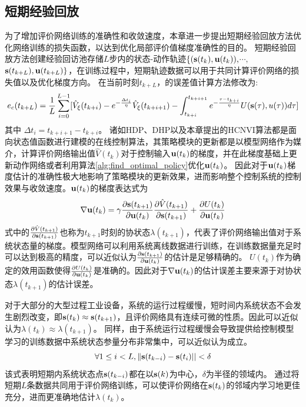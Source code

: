 \subsection{短期经验回放}
为了增加评价网络训练的准确性和收敛速度，本章进一步提出短期经验回放方法优化网络训练的损失函数，以达到优化局部评价值梯度准确性的目的。
短期经验回放方法创建经验回访池存储$L$步内的状态-动作轨迹$\{(\mathbf s(t_k), \mathbf u(t_k))\text{,}$$\cdots \text{,}$$\mathbf s(t_{k+L}), \mathbf u(t_{k+L})\}$，在训练过程中，短期轨迹数据可以用于共同计算评价网络的损失值以及优化梯度方向。
在当前时刻$t_{k+L}$，的误差值计算方法修改为:
\begin{equation}
  e_{c }(t_{k+L})=\frac{1}{L}\sum_{i=0}^{L-1}[\hat{V}_{\xi}(t_{k+i})-e^{-\frac{\Delta t_i}{\eta}} \hat{V}_{\xi}(t_{k+i+1})-\int_{t_{k+i}}^{t_{k+i+1}}e^{-\frac{\tau-t_{k+i}}{\eta}}U(\mathbf s(\tau), u(\tau))d \tau]
  \label{equ:TDerror_replay}
  \end{equation}
  其中 $\Delta t_i = t_{k+i+1}-t_{k+i}$。
诸如HDP、DHP以及本章提出的HCNVI算法都是面向状态值函数进行建模的在线控制算法，其策略模块的更新都是以模型网络作为媒介，计算评价网络输出值$\hat{V}(t_k)$对于控制输入${\mathbf
u}(t_k)$的梯度，并在此梯度基础上更新动作网络或者利用算法\ref{alg:find_optimal_policy}优化${\mathbf u}(t_k)$。
因此对于${\mathbf u}(t_k)$梯度估计的准确性极大地影响了策略模块的更新效果，进而影响整个控制系统的控制效果与收敛速度。${\mathbf u}(t_k)$的梯度表达式为
\begin{equation}
\label{equ:uk_grad} \nabla \mathbf u(t_k)=\gamma\frac{\partial \mathbf s(t_{k+1})}{\partial \mathbf u(t_k)}\frac{\partial\hat{V}(t_{k+1})}{\partial \mathbf s(t_{k+1})}+\frac{\partial U(t_k)}{\partial \mathbf u(t_k)}
\end{equation}
式中的$\frac{\partial\hat{V}(t_{k+1})}{\partial \mathbf
s(t_{k+1})}$也称为$t_{k+1}$时刻的协状态$\lambda(t_{k+1})$，代表了评价网络输出值对于系统状态量的梯度。模型网络可以利用系统离线数据进行训练，在训练数据量充足时可以达到极高的精度，可以近似认为$\frac{\partial
\mathbf s(t_{k+1})}{\partial \mathbf u(t_k)}$的估计是足够精确的。
$U(t_k)$作为确定的效用函数使得$\frac{\partial U(t_k)}{\partial \mathbf
u(t_k)}$是准确的。因此对于$\nabla \mathbf
u(t_k)$的估计误差主要来源于对协状态$\lambda(t_{k+1})$的估计误差。

对于大部分的大型过程工业设备，系统的运行过程缓慢，短时间内系统状态不会发生剧烈改变，即$\mathbf s(t_k)\approx \mathbf s(t_{k+1})$，且评价网络具有连续可微的性质。因此可以近似认为$\lambda(t_k)\approx \lambda(t_{k+1})$。
同样，由于系统运行过程缓慢会导致提供给控制模型学习的训练数据中系统状态参量分布非常集中，可以近似认为成立。
\begin{equation}
\label{equ:x_equation} \forall 1 \leq i<L, \| \mathbf s(t_{k-i})-\mathbf s(t_i)||<\delta
\end{equation}
该式表明短期内系统状态点$\mathbf s(t_{k-i})$都在以$\mathbf s(k)$为中心，$\delta$为半径的领域内。
通过将短期$L$条数据共同用于评价网络训练，可以使评价网络在$\mathbf s(t_k)$的邻域内学习地更佳充分，进而更准确地估计$\lambda(t_k)$。

